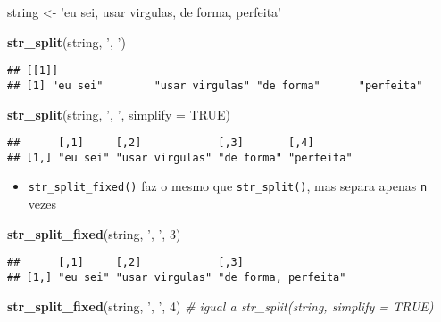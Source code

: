\documentclass[]{book}
\newenvironment{Shaded}{\begin{snugshade}}{\end{snugshade}}
\newcommand{\KeywordTok}[1]{\textcolor[rgb]{0.13,0.29,0.53}{\textbf{{#1}}}}
\newcommand{\DataTypeTok}[1]{\textcolor[rgb]{0.13,0.29,0.53}{{#1}}}
\newcommand{\DecValTok}[1]{\textcolor[rgb]{0.00,0.00,0.81}{{#1}}}
\newcommand{\StringTok}[1]{\textcolor[rgb]{0.31,0.60,0.02}{{#1}}}
\newcommand{\CommentTok}[1]{\textcolor[rgb]{0.56,0.35,0.01}{\textit{{#1}}}}
\newcommand{\OtherTok}[1]{\textcolor[rgb]{0.56,0.35,0.01}{{#1}}}
\newcommand{\NormalTok}[1]{{#1}}
\providecommand{\tightlist}{%
  \setlength{\itemsep}{0pt}\setlength{\parskip}{0pt}}
\begin{document}
\begin{Shaded}
\begin{Highlighting}[]
\NormalTok{string <-}\StringTok{ 'eu sei, usar virgulas, de forma, perfeita'}

\KeywordTok{str_split}\NormalTok{(string, }\StringTok{', '}\NormalTok{)}
\end{Highlighting}
\end{Shaded}

\begin{verbatim}
## [[1]]
## [1] "eu sei"        "usar virgulas" "de forma"      "perfeita"
\end{verbatim}

\begin{Shaded}
\begin{Highlighting}[]
\KeywordTok{str_split}\NormalTok{(string, }\StringTok{', '}\NormalTok{, }\DataTypeTok{simplify =} \OtherTok{TRUE}\NormalTok{)}
\end{Highlighting}
\end{Shaded}

\begin{verbatim}
##      [,1]     [,2]            [,3]       [,4]      
## [1,] "eu sei" "usar virgulas" "de forma" "perfeita"
\end{verbatim}

\begin{itemize}
\tightlist
\item
  \texttt{str\_split\_fixed()} faz o mesmo que \texttt{str\_split()},
  mas separa apenas \texttt{n} vezes
\end{itemize}

\begin{Shaded}
\begin{Highlighting}[]
\KeywordTok{str_split_fixed}\NormalTok{(string, }\StringTok{', '}\NormalTok{, }\DecValTok{3}\NormalTok{)}
\end{Highlighting}
\end{Shaded}

\begin{verbatim}
##      [,1]     [,2]            [,3]                
## [1,] "eu sei" "usar virgulas" "de forma, perfeita"
\end{verbatim}

\begin{Shaded}
\begin{Highlighting}[]
\KeywordTok{str_split_fixed}\NormalTok{(string, }\StringTok{', '}\NormalTok{, }\DecValTok{4}\NormalTok{) }\CommentTok{# igual a str_split(string, simplify = TRUE)}
\end{Highlighting}
\end{Shaded}
\end{document}
